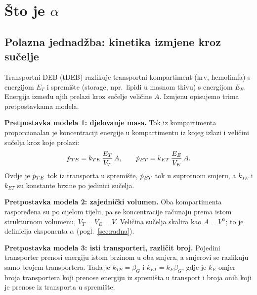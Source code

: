 \section{Što je $\alpha$}\label{sec:definicija}

\subsection{Polazna jednadžba: kinetika izmjene kroz sučelje}\label{sec:polazna}

Transportni DEB (tDEB) razlikuje transportni kompartiment (krv, hemolimfa) s energijom $E_T$ i spremište (storage, npr.\ lipidi u masnom tkivu) s energijom $E_E$. Energija između njih prelazi kroz sučelje veličine $A$. Izmjenu opisujemo trima pretpostavkama modela.

\textbf{Pretpostavka modela 1: djelovanje masa.} Tok iz kompartimenta proporcionalan je koncentraciji energije u kompartimentu iz kojeg izlazi i veličini sučelja kroz koje prolazi:
\begin{equation}
\dot{p}_{TE}=k_{TE}\,\frac{E_T}{V_T}\,A,\qquad \dot{p}_{ET}=k_{ET}\,\frac{E_E}{V_E}\,A .
\end{equation}
Ovdje je $\dot{p}_{TE}$ tok iz transporta u spremište, $\dot{p}_{ET}$ tok u suprotnom smjeru, a $k_{TE}$ i $k_{ET}$ su konstante brzine po jedinici sučelja.

\textbf{Pretpostavka modela 2: zajednički volumen.} Oba kompartimenta raspoređena su po cijelom tijelu, pa se koncentracije računaju prema istom strukturnom volumenu, $V_T=V_E=V$. Veličina sučelja skalira kao $A=V^{\alpha}$; to je definicija eksponenta $\alpha$ (pogl.~\ref{sec:radna}).

\textbf{Pretpostavka modela 3: isti transporteri, različit broj.} Pojedini transporter prenosi energiju istom brzinom u oba smjera, a smjerovi se razlikuju samo brojem transportera. Tada je $k_{TE}=\beta_G$ i $k_{ET}=k_E\beta_G$, gdje je $k_E$ omjer broja transportera koji prenose energiju iz spremišta u transport i broja onih koji je prenose iz transporta u spremište.

